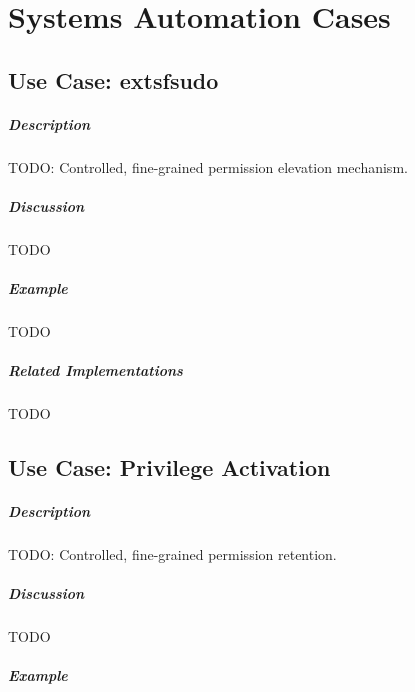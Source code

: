 \chapter{Systems Automation Cases}

\section{Use Case:         extsf{sudo}}

\paragraph{Description}

{\Large TODO:} Controlled, fine-grained permission elevation mechanism.

\paragraph{Discussion}

{\Large TODO}

\paragraph{Example}

{\Large TODO}

\paragraph{Related Implementations}

{\Large TODO}

\section{Use Case: Privilege Activation}

\paragraph{Description}

{\Large TODO:} Controlled, fine-grained permission retention.

\paragraph{Discussion}

{\Large TODO}

\paragraph{Example}


